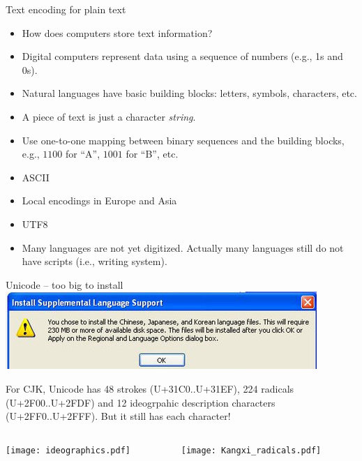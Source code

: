 \documentclass[11pt]{beamer}
\begin{document}
\begin{frame}{Text encoding for plain text}
 \begin{itemize}[<+->]
  \item How does computers store text information? 
  \item Digital computers represent data using a sequence of numbers (e.g., 1s and 0s). 
  \item Natural languages have basic building blocks: letters, symbols, characters, etc. 
  \item A piece of text is just a character \emph{string}.
  \item Use one-to-one mapping between binary sequences and the building blocks, e.g., $1100$ for ``A'', $1001$ for ``B'', etc. 
  \item ASCII
  \item Local encodings in Europe and Asia
  \item UTF8
  \item Many languages are not yet digitized. Actually many languages still do not have scripts (i.e., writing system). 
 \end{itemize}
\end{frame}

\begin{frame}{Unicode -- too big to install}
\centering
\includegraphics[width=.6\textwidth]{Windows_XP_CJK.jpg}

For CJK, Unicode has 48 strokes (U+31C0..U+31EF), 224 radicals (U+2F00..U+2FDF) and 12 ideogrpahic description characters (U+2FF0..U+2FFF). But it still has each character! 

\begin{columns}[c]
  \begin{column}{.5\textwidth}
  \texttt{[image: ideographics.pdf]}
  \end{column}
\begin{column}{.5\textwidth}
  \texttt{[image: Kangxi\_radicals.pdf]}
\end{column}
\end{columns}
\end{frame}
\end{document}
